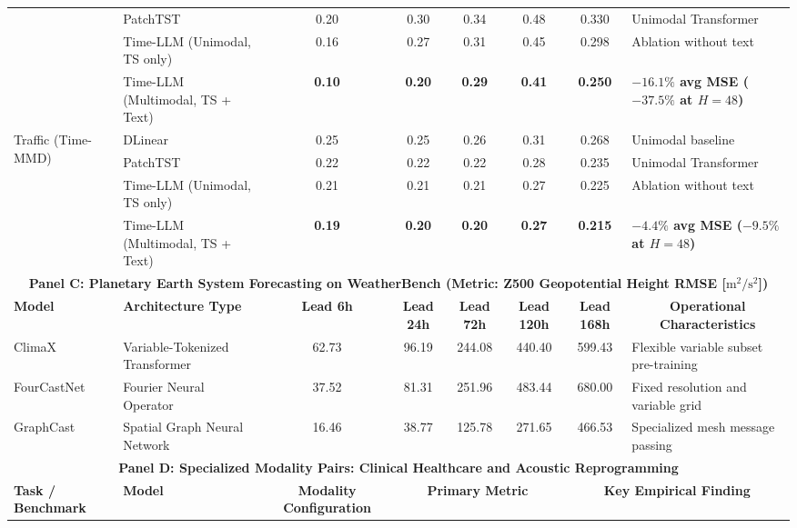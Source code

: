 \begin{table}[t]
{\begin{tabular}{llcccccccc}
& PatchTST & 0.20 & 0.30 & 0.34 & 0.48 & 0.330 & \multicolumn{3}{l}{Unimodal Transformer} \\
& Time-LLM (Unimodal, TS only) & 0.16 & 0.27 & 0.31 & 0.45 & 0.298 & \multicolumn{3}{l}{Ablation without text} \\
& Time-LLM (Multimodal, TS + Text) & \textbf{0.10} & \textbf{0.20} & \textbf{0.29} & \textbf{0.41} & \textbf{0.250} & \multicolumn{3}{l}{\textbf{$-16.1\%$ avg MSE ($-37.5\%$ at $H=48$)}} \\
\midrule
\multirow{4}{*}{Traffic (Time-MMD)~\cite{Liu2024TimeMMD}} & DLinear & 0.25 & 0.25 & 0.26 & 0.31 & 0.268 & \multicolumn{3}{l}{Unimodal baseline} \\
& PatchTST & 0.22 & 0.22 & 0.22 & 0.28 & 0.235 & \multicolumn{3}{l}{Unimodal Transformer} \\
& Time-LLM (Unimodal, TS only) & 0.21 & 0.21 & 0.21 & 0.27 & 0.225 & \multicolumn{3}{l}{Ablation without text} \\
& Time-LLM (Multimodal, TS + Text) & \textbf{0.19} & \textbf{0.20} & \textbf{0.20} & \textbf{0.27} & \textbf{0.215} & \multicolumn{3}{l}{\textbf{$-4.4\%$ avg MSE ($-9.5\%$ at $H=48$)}} \\
\midrule
\multicolumn{10}{c}{\textbf{Panel C: Planetary Earth System Forecasting on WeatherBench (Metric: Z500 Geopotential Height RMSE [$\text{m}^2/\text{s}^2$])}} \\
\midrule
\textbf{Model} & \textbf{Architecture Type} & \textbf{Lead 6h} & \textbf{Lead 24h} & \textbf{Lead 72h} & \textbf{Lead 120h} & \textbf{Lead 168h} & \multicolumn{3}{c}{\textbf{Operational Characteristics}} \\
\midrule
ClimaX~\cite{Nguyen2023ClimaX} & Variable-Tokenized Transformer & 62.73 & 96.19 & 244.08 & 440.40 & 599.43 & \multicolumn{3}{l}{Flexible variable subset pre-training} \\
FourCastNet~\cite{Nguyen2023ClimaX} & Fourier Neural Operator & 37.52 & 81.31 & 251.96 & 483.44 & 680.00 & \multicolumn{3}{l}{Fixed resolution and variable grid} \\
GraphCast~\cite{Nguyen2023ClimaX} & Spatial Graph Neural Network & 16.46 & 38.77 & 125.78 & 271.65 & 466.53 & \multicolumn{3}{l}{Specialized mesh message passing} \\
\midrule
\multicolumn{10}{c}{\textbf{Panel D: Specialized Modality Pairs: Clinical Healthcare and Acoustic Reprogramming}} \\
\midrule
\textbf{Task / Benchmark} & \textbf{Model} & \textbf{Modality Configuration} & \multicolumn{3}{c}{\textbf{Primary Metric}} & \multicolumn{4}{c}{\textbf{Key Empirical Finding}} \\

\end{tabular}}
\end{table}
